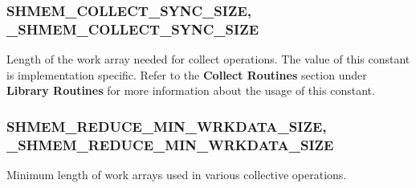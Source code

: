 \subsubsection*{SHMEM\_COLLECT\_SYNC\_SIZE, \_SHMEM\_COLLECT\_SYNC\_SIZE }

Length of the work array needed for collect operations. The value
of this constant is implementation specific. Refer to the \textbf{Collect
Routines} section under \textbf{Library Routines} for more information
about the usage of this constant.


\subsubsection*{SHMEM\_REDUCE\_MIN\_WRKDATA\_SIZE, \_SHMEM\_REDUCE\_MIN\_WRKDATA\_SIZE }

Minimum length of work arrays used in various collective operations.

